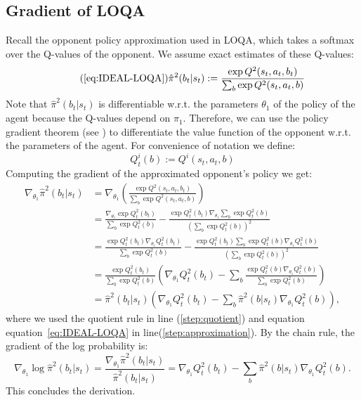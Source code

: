 \documentclass{article} \usepackage{iclr2025_conference,times}
\def\eqref#1{equation~\ref{#1}}
\begin{document}
\subsection{Gradient of LOQA}
\label{app:LOQA_grad}
Recall the opponent policy approximation used in LOQA, which takes a softmax over the Q-values of the opponent. We assume exact estimates of these Q-values:
\begin{equation}
    \tag{\ref{eq:IDEAL-LOQA}}
    \hat{\pi}^2(b_t|s_t) := \frac{\exp Q^2(s_t, a_t, b_t)}{\sum_{b}\exp Q^2(s_t, a_t, b)}
\end{equation}
Note that $\hat{\pi}^2(b_t|s_t)$ is differentiable w.r.t. the parameters $\theta_1$ of the policy of the agent because the Q-values depend on $\pi_1$. Therefore, we can use the policy gradient theorem (see \cite{aghajohari2024loqa}) to differentiate the value function of the opponent w.r.t. the parameters of the agent. For convenience of notation we define:
\[
    Q^i_t(b) := Q^i(s_t, a_t, b)
\]
Computing the gradient of the approximated opponent's policy we get:
\begin{align}
    \nabla_{\theta_1}\hat{\pi}^2(b_t|s_t) &=  \nabla_{\theta_1} \left( \frac{\exp Q^2(s_t, a_t, b_t)}{\sum_{b}\exp Q^2(s_t, a_t, b)} \right)\\
    &= \frac{\nabla_{\theta_1}\exp Q^2_t(b_t)}{\sum_{b}\exp Q^2_t(b)} - \frac{\exp Q^2_t(b_t) \nabla_{\theta_1}\sum_{b}\exp Q^2_t(b)}{\left(\sum_{b}\exp Q^2_t(b)\right)^2} \label{step:quotient}\\
    &= \frac{\exp Q^2_t(b_t)\nabla_{\theta_1}Q^2_t(b_t)}{\sum_{b}\exp Q^2_t(b)} - \frac{\exp Q^2_t(b_t) \sum_{b}\exp Q^2_t(b) \nabla_{\theta_1} Q^2_t(b)}{\left(\sum_{b}\exp Q^2_t(b)\right)^2}\\
    &= \frac{\exp Q^2_t(b_t)}{\sum_{b}\exp Q^2_t(b)} \left( \nabla_{\theta_1}Q^2_t(b_t) - \sum_b \frac{\exp Q^2_t(b) \nabla_{\theta_1} Q^2_t(b)}{\sum_{b}\exp Q^2_t(b)}\right)\\
    &= \hat{\pi}^2(b_t|s_t) \left( \nabla_{\theta_1}Q^2_t(b_t) - \sum_b \hat{\pi}^2(b|s_t) \nabla_{\theta_1} Q^2_t(b)\right) \label{step:approximation},
\end{align}
where we used the quotient rule in line (\ref{step:quotient}) and equation \eqref{eq:IDEAL-LOQA} in line(\ref{step:approximation}).
By the chain rule, the gradient of the log probability is:
\[
    \nabla_{\theta_1}\log \hat{\pi}^2(b_t|s_t)
    = \frac{\nabla_{\theta_1} \hat\pi^2(b_t|s_t)}{\hat\pi^2(b_t|s_t)} 
    = \nabla_{\theta_1}Q^2_t(b_t) - \sum_b \hat{\pi}^2(b|s_t) \nabla_{\theta_1} Q^2_t(b).
\]
This concludes the derivation.
\end{document}
